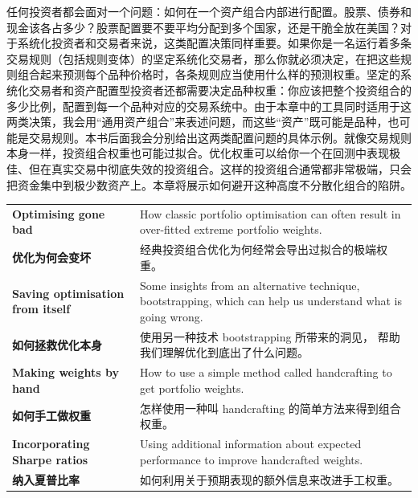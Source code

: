 \begin{chineseblock}任何投资者都会面对一个问题：如何在一个资产组合内部进行配置。股票、债券和现金该各占多少？股票配置要不要平均分配到多个国家，还是干脆全放在美国？对于系统化投资者和交易者来说，这类配置决策同样重要。如果你是一名运行着多条交易规则（包括规则变体）的坚定系统化交易者，那么你就必须决定，在把这些规则组合起来预测每个品种价格时，各条规则应当使用什么样的预测权重。坚定的系统化交易者和资产配置型投资者还都需要决定品种权重：你应该把整个投资组合的多少比例，配置到每一个品种对应的交易系统中。由于本章中的工具同时适用于这两类决策，我会用“通用资产组合”来表述问题，而这些“资产”既可能是品种，也可能是交易规则。本书后面我会分别给出这两类配置问题的具体示例。就像交易规则本身一样，投资组合权重也可能过拟合。优化权重可以给你一个在回测中表现极佳、但在真实交易中彻底失效的投资组合。这样的投资组合通常都非常极端，只会把资金集中到极少数资产上。本章将展示如何避开这种高度不分散化组合的陷阱。\end{chineseblock}


\begin{bilingualtableblock} \begin{tabularx}{\textwidth}{@{} L{0.30\textwidth} Y@{}}\textbf{Optimising gone bad} & How classic portfolio optimisation can often result in over-fitted extreme portfolio weights. \\

\textbf{优化为何会变坏} & 经典投资组合优化为何经常会导出过拟合的极端权重。 \\
\textbf{Saving optimisation from itself} & Some insights from an alternative technique, bootstrapping, which can help us understand what is going wrong. \\
\textbf{如何拯救优化本身} & 使用另一种技术 bootstrapping 所带来的洞见， 帮助我们理解优化到底出了什么问题。 \\
\textbf{Making weights by hand} & How to use a simple method called handcrafting to get portfolio weights. \\
\textbf{如何手工做权重} & 怎样使用一种叫 handcrafting 的简单方法来得到组合权重。 \\
\textbf{Incorporating Sharpe ratios} & Using additional information about expected performance to improve handcrafted weights. \\
\textbf{纳入夏普比率} & 如何利用关于预期表现的额外信息来改进手工权重。 \\
\end{tabularx}
\end{bilingualtableblock}

